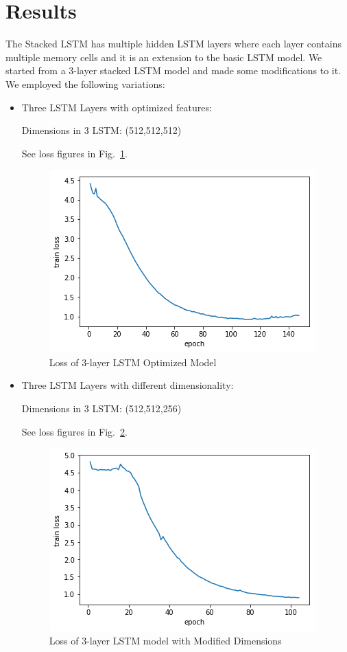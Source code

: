 \documentclass[conference]{IEEEtran}
\begin{document}
\section{Results}
The Stacked LSTM has multiple hidden LSTM layers where each layer contains multiple memory cells and it is an extension to the basic LSTM model. We started from a 3-layer stacked LSTM model and made some modifications to it. We employed the following variations: 
\begin{itemize}

\item Three LSTM Layers with optimized features: 

Dimensions in 3 LSTM: (512,512,512)

See loss figures in Fig.~\ref{fig1}.

\begin{figure}[htbp]
\centerline{\includegraphics[scale=0.6]{loss_optimal.png}}
\caption{Loss of 3-layer LSTM Optimized Model}
\label{fig1}
\end{figure}

\item Three LSTM Layers with different dimensionality:  

Dimensions in 3 LSTM: (512,512,256)

See loss figures in Fig.~\ref{fig2}.

\begin{figure}[htbp]
\centerline{\includegraphics[scale=0.6]{log_to256.png}}
\caption{Loss of 3-layer LSTM model with Modified Dimensions}
\label{fig2}
\end{figure}


\end{itemize}
\end{document}
